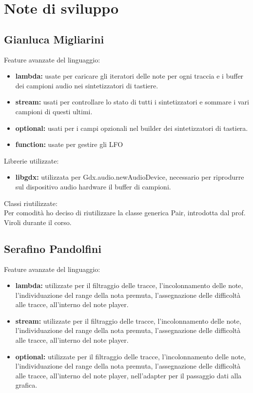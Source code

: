 \documentclass[a4paper,12pt]{report}
\begin{document}
\section{Note di sviluppo}
\subsection{Gianluca Migliarini}
Feature avanzate del linguaggio:
\begin{itemize}
	\item \textbf{lambda:} usate per caricare gli iteratori delle note per ogni traccia e i buffer dei campioni audio nei sintetizzatori di tastiere.
	\item \textbf{stream:} usati per controllare lo stato di tutti i sintetizzatori e sommare i vari campioni di questi ultimi.
	\item \textbf{optional:} usati per i campi opzionali nel builder dei sintetizzatori di tastiera. 
	\item \textbf{function:} usate per gestire gli LFO
\end{itemize}
Librerie utilizzate:
\begin{itemize}
	\item \textbf{libgdx:} utilizzata per Gdx.audio.newAudioDevice, necessario per riprodurre sul dispositivo audio hardware il buffer di campioni.
\end{itemize}
Classi riutilizzate: \\
Per comodità ho deciso di riutilizzare la classe generica Pair, introdotta dal prof. Viroli durante il corso.
\newpage

\subsection{Serafino Pandolfini}
Feature avanzate del linguaggio:
\begin{itemize}
	\item \textbf{lambda:} utilizzate per il filtraggio delle tracce, l'incolonnamento delle note, l'individuazione del range della nota premuta, l'assegnazione delle difficoltà alle tracce, all'interno del note player.
	\item \textbf{stream:} utilizzate per il filtraggio delle tracce, l'incolonnamento delle note, l'individuazione del range della nota premuta, l'assegnazione delle difficoltà alle tracce, all'interno del note player.
	\item \textbf{optional:} utilizzate per il filtraggio delle tracce, l'incolonnamento delle note, l'individuazione del range della nota premuta, l'assegnazione delle difficoltà alle tracce, all'interno del note player, nell'adapter per il passaggio dati alla grafica.
\end{itemize}
\newpage
\end{document}
